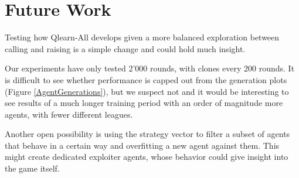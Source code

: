 \section{Future Work}

Testing how Qlearn-All develops given a more balanced exploration between calling and raising is a simple change and could hold much insight.

Our experiments have only tested 2'000 rounds, with clones every 200 rounds. It is difficult to see whether performance is capped out from the generation plots (Figure \ref{AgentGenerations}), but we suspect not and it would be interesting to see results of a much longer training period with an order of magnitude more agents, with fewer different leagues.

Another open possibility is using the strategy vector to filter a subset of agents that behave in a certain way and overfitting a new agent against them. This might create dedicated exploiter agents, whose behavior could give insight into the game itself.